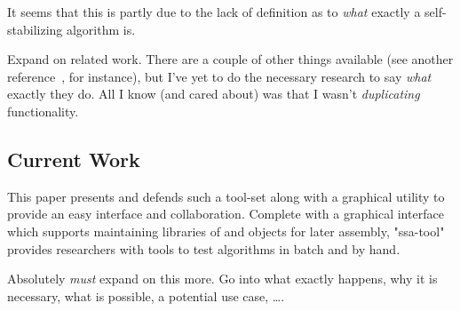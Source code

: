 It seems that this is partly due to the lack of definition as to
  \emph{what} exactly a self-stabilizing algorithm is.

\begin{draftvspace}{2in}
  Expand on related work.
  There are a couple of other things available
    (see another reference~\autocite{lafon:libcircle}, for instance),
    but I've yet to do the necessary research to say \emph{what} exactly they do.
  All I know (and cared about) was that I wasn't \emph{duplicating} functionality.
\end{draftvspace}

\subsection{Current Work}
\label{sec:introduction:current-work}
This paper presents and defends such a tool-set
  along with a graphical utility to provide an easy interface and collaboration.
Complete with a graphical interface which supports
  maintaining libraries of  and  objects for later assembly,
  "ssa-tool" provides researchers with tools to test algorithms in batch and by hand.
\begin{draftvspace}{4in}
  Absolutely \emph{must} expand on this more.
  Go into what exactly happens, why it is necessary, what is possible, a potential use case, \dots.
\end{draftvspace}

